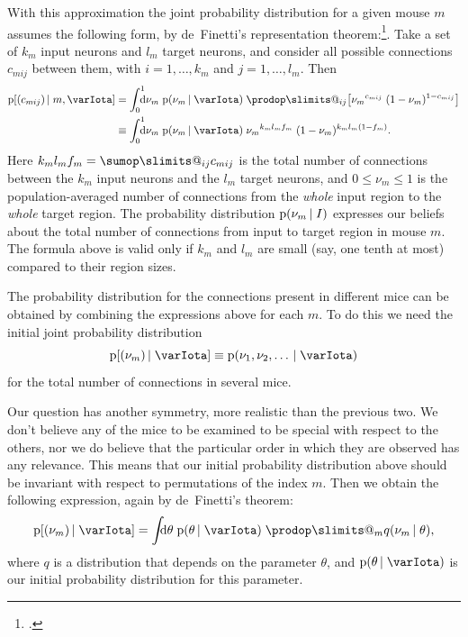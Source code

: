 \documentclass[\ifafour a4paper,12pt,\else a5paper,10pt,\fi%
onecolumn,oneside,article,%
british%
]{memoir}
\makeatletter
\theoremstyle{remark}
\theoremstyle{innote}
\def\sum{\DOTSI\sumop\slimits@}
\def\prod{\DOTSI\prodop\slimits@}
\newcommand*{\citep}{\footcites}
\newcommand*{\di}{\mathrm{d}}%
\renewcommand*{\le}{\leqslant}%
\newcommand*{\pf}{\mathrm{p}}%
\renewcommand*{\|}[1][]{\nonscript\,#1\vert\nonscript\;\mathopen{}}
\newcommand*{\yI}{\varIota}
\newcommand*{\yc}{c}
\newcommand*{\yf}{f}
\newcommand*{\yq}{q}
\newcommand*{\yth}{\theta}
\makeatother
\begin{document}
With this approximation the joint probability distribution for a given
mouse $m$ assumes the following form, by de~Finetti's representation
theorem:\citep{definetti1930,hewittetal1955,heathetal1976,diaconis1977,diaconisetal1980,dawid2013}.
Take a set of $k_{m}$ input neurons and $l_{m}$ target neurons, and
consider all possible connections $\yc_{mij}$ between them, with
$i=1,\dotsc,k_{m}$ and $j=1,\dotsc,l_{m}$. Then
\begin{equation}
  \label{eq:definetti_ij}
  \begin{split}
  \pf[(\yc_{mij}) \| m, \yI] &=
  \int_{0}^{1}\!\!\!\!\di\nu_{m}\;\pf(\nu_{m} \| \yI)\;
  \prod_{ij}\bigl[
  {\nu_{m}}^{\yc_{mij}}\;(1-\nu_{m})^{1-\yc_{mij}}
  \bigr]
  \\
  &\equiv \int_{0}^{1}\!\!\!\!\di\nu_{m}\;\pf(\nu_{m} \| \yI)\;
  {\nu_{m}}^{k_{m}l_{m}\yf_{m}}\;
  (1-\nu_{m})^{k_{m}l_{m}(1-\yf_{m})}.
\end{split}
\end{equation}
Here $k_{m}l_{m}\yf_{m} = \sum_{ij} \yc_{mij}$ is the total number of
connections between the $k_{m}$ input neurons and the $l_{m}$ target
neurons, and $0\le \nu_{m} \le 1$ is the population-averaged number of
connections from the \emph{whole} input region to the \emph{whole} target
region. The probability distribution $\pf(\nu_{m} \| I)$ expresses our
beliefs about the total number of connections from input to target region
in mouse $m$. The formula above is valid only if $k_{m}$ and $l_{m}$ are
small (say, one tenth at most) compared to their region sizes.

\medskip

The probability distribution for the connections present in different mice
can be obtained by combining the expressions above for each $m$. To do this
we need the initial joint probability distribution
\begin{equation}\label{eq:joint_nu_generic}
  \pf[(\nu_{m}) \| \yI]
  \equiv \pf(\nu_{1}, \nu_{2}, \dotsc \| \yI)
\end{equation}
for the total number of connections in several mice.

Our question has another symmetry, more realistic than the previous two. We
don't believe any of the mice to be examined to be special with respect to
the others, nor we do believe that the particular order in which they are
observed has any relevance. This means that our initial probability
distribution above should be invariant with respect to permutations of the
index $m$. Then we obtain the following expression, again by de~Finetti's
theorem:
\begin{equation}\label{eq:joint_nu_definetti}
  \pf[(\nu_{m}) \| \yI] =
  \int\!\!\!\di\yth\;\pf(\yth \| \yI)\;
  \prod_{m}  \yq(\nu_{m} \| \yth),
\end{equation}
where $\yq$ is a distribution that depends on the parameter $\yth$, and
$\pf(\yth \| \yI)$ is our initial probability distribution for this
parameter.
\end{document}
